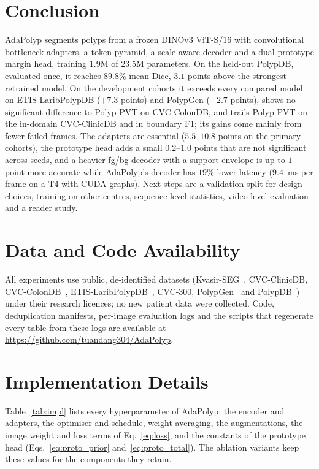 \documentclass{ieeeaccess}
\begin{document}
\section{Conclusion}
AdaPolyp segments polyps from a frozen DINOv3 ViT-S/16 with convolutional bottleneck adapters, a token pyramid, a scale-aware decoder and a dual-prototype margin head, training $1.9$M of $23.5$M parameters. On the held-out PolypDB, evaluated once, it reaches $89.8\%$ mean Dice, $3.1$ points above the strongest retrained model. On the development cohorts it exceeds every compared model on ETIS-LaribPolypDB ($+7.3$ points) and PolypGen ($+2.7$ points), shows no significant difference to Polyp-PVT on CVC-ColonDB, and trails Polyp-PVT on the in-domain CVC-ClinicDB and in boundary F1; its gains come mainly from fewer failed frames. The adapters are essential ($5.5$--$10.8$ points on the primary cohorts), the prototype head adds a small $0.2$--$1.0$ points that are not significant across seeds, and a heavier fg/bg decoder with a support envelope is up to $1$ point more accurate while AdaPolyp's decoder has $19\%$ lower latency ($9.4$~ms per frame on a T4 with CUDA graphs). Next steps are a validation split for design choices, training on other centres, sequence-level statistics, video-level evaluation and a reader study.

\section*{Data and Code Availability}
All experiments use public, de-identified datasets (Kvasir-SEG~\cite{jha2020kvasir}, CVC-ClinicDB, CVC-ColonDB~\cite{tajbakhsh2015automated}, ETIS-LaribPolypDB~\cite{silva2014toward}, CVC-300, PolypGen~\cite{ali2023polypgen} and PolypDB~\cite{jha2024polypdb}) under their research licences; no new patient data were collected. Code, deduplication manifests, per-image evaluation logs and the scripts that regenerate every table from these logs are available at \url{https://github.com/tuandang304/AdaPolyp}.

\appendices

\section{Implementation Details}
\label{app:impl}
Table~\ref{tab:impl} lists every hyperparameter of AdaPolyp: the encoder and adapters, the optimiser and schedule, weight averaging, the augmentations, the image weight and loss terms of Eq.~\eqref{eq:loss}, and the constants of the prototype head (Eqs.~\eqref{eq:proto_prior} and~\eqref{eq:proto_total}). The ablation variants keep these values for the components they retain.
\end{document}
